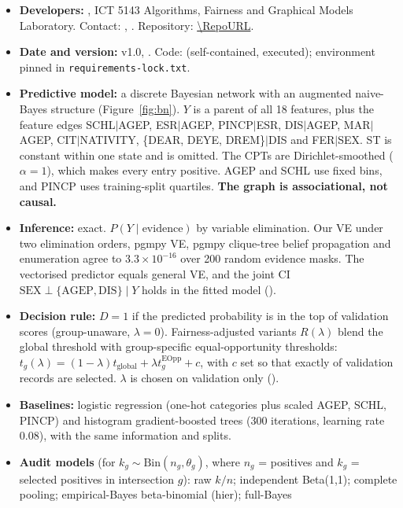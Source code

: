 \documentclass[10pt]{article}
\begin{document}
\begin{itemize}
  \item \textbf{Developers:} \Authors, ICT 5143 Algorithms, Fairness and Graphical Models Laboratory. Contact: \texttt{\EmailA}, \texttt{\EmailB}. Repository: \url{\RepoURL}.
  \item \textbf{Date and version:} v1.0, \nbDate. Code: \nb{} (self-contained, executed); environment pinned in \texttt{requirements-\allowbreak lock.txt}.
  \item \textbf{Predictive model:} a discrete Bayesian network with an augmented naive-Bayes structure (Figure~\ref{fig:bn}).
    $Y$ is a parent of all 18 features, plus the feature edges SCHL$\mid$AGEP, ESR$\mid$AGEP, PINCP$\mid$ESR,
    DIS$\mid$AGEP, MAR$\mid$AGEP, CIT$\mid$NATIVITY, \{DEAR, DEYE, DREM\}$\mid$DIS and FER$\mid$SEX. ST is constant
    within one state and is omitted. The CPTs are Dirichlet-smoothed ($\alpha=1$), which makes every entry positive.
    AGEP and SCHL use fixed bins, and PINCP uses training-split quartiles. \textbf{The graph is associational, not causal.}
  \item \textbf{Inference:} exact. $P(Y\mid\text{evidence})$ by variable elimination. Our VE under two elimination orders,
    pgmpy VE, pgmpy clique-tree belief propagation and enumeration agree to $3.3\times10^{-16}$ over 200 random evidence
    masks. The vectorised predictor equals general VE, and the joint CI $\text{SEX}\perp\{\text{AGEP},\text{DIS}\}\mid Y$
    holds in the fitted model ().
  \item \textbf{Decision rule:} $D=1$ if the predicted probability is in the top \capacity{} of validation scores
    (group-unaware, $\lambda=0$). Fairness-adjusted variants $R(\lambda)$ blend the global threshold with group-specific
    equal-opportunity thresholds: $t_g(\lambda)=(1-\lambda)t_{\text{global}}+\lambda t_g^{\text{EOpp}}+c$, with $c$ set
    so that exactly \capacity{} of validation records are selected. $\lambda$ is chosen on validation only ().
  \item \textbf{Baselines:} logistic regression (one-hot categories plus scaled AGEP, SCHL, PINCP) and histogram
    gradient-boosted trees (300 iterations, learning rate 0.08), with the same information and splits.
  \item \textbf{Audit models} (for $k_g\sim\text{Bin}(n_g,\theta_g)$, where $n_g$ = positives and $k_g$ = selected positives in
    intersection $g$): raw $k/n$; independent Beta(1,1); complete pooling; empirical-Bayes beta-binomial (hier); full-Bayes

\end{itemize}
\end{document}
